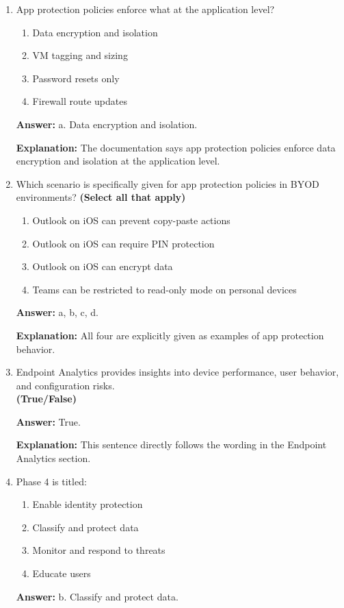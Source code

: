 \documentclass[10pt]{article}
\begin{document}
\begin{enumerate}[leftmargin=*]
\textbf{Explanation:} This scenario follows the exact example used in the endpoint compliance policies section.

\item App protection policies enforce what at the application level?
\begin{enumerate}[label=\alph*., leftmargin=1.5em]
\item Data encryption and isolation
\item VM tagging and sizing
\item Password resets only
\item Firewall route updates
\end{enumerate}
\textbf{Answer:} a. Data encryption and isolation.

\textbf{Explanation:} The documentation says app protection policies enforce data encryption and isolation at the application level.

\item Which scenario is specifically given for app protection policies in BYOD environments? \textbf{(Select all that apply)}
\begin{enumerate}[label=\alph*., leftmargin=1.5em]
\item Outlook on iOS can prevent copy-paste actions
\item Outlook on iOS can require PIN protection
\item Outlook on iOS can encrypt data
\item Teams can be restricted to read-only mode on personal devices
\end{enumerate}
\textbf{Answer:} a, b, c, d.

\textbf{Explanation:} All four are explicitly given as examples of app protection behavior.

\item Endpoint Analytics provides insights into device performance, user behavior, and configuration risks.\\
\textbf{(True/False)}

\textbf{Answer:} True.

\textbf{Explanation:} This sentence directly follows the wording in the Endpoint Analytics section.

\item Phase 4 is titled:
\begin{enumerate}[label=\alph*., leftmargin=1.5em]
\item Enable identity protection
\item Classify and protect data
\item Monitor and respond to threats
\item Educate users
\end{enumerate}
\textbf{Answer:} b. Classify and protect data.


\end{enumerate}
\end{document}
